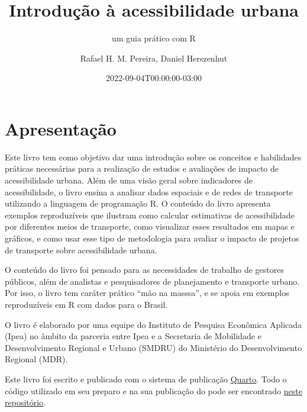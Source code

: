 \documentclass[
  letterpaper,
  DIV=11,
  numbers=noendperiod]{scrreprt}
\title{Introdução à acessibilidade urbana}
\subtitle{um guia prático com R}
\author{Rafael H. M. Pereira, Daniel Herszenhut}
\date{2022-09-04T00:00:00-03:00}
\renewcommand*\contentsname{Table of contents}
\newcommand\contentsname{Table of contents}
\begin{document}
\maketitle
\ifdefined\Shaded\renewenvironment{Shaded}{\begin{tcolorbox}[breakable, sharp corners, boxrule=0pt, enhanced, borderline west={3pt}{0pt}{shadecolor}, frame hidden, interior hidden]}{\end{tcolorbox}}\fi

\renewcommand*\contentsname{Table of contents}
{
\hypersetup{linkcolor=}
\setcounter{tocdepth}{2}
\tableofcontents
}
\hypertarget{apresentauxe7uxe3o}{%
\chapter*{Apresentação}\label{apresentauxe7uxe3o}}

Este livro tem como objetivo dar uma introdução sobre os conceitos e
habilidades práticas necessárias para a realização de estudos e
avaliações de impacto de acessibilidade urbana. Além de uma visão geral
sobre indicadores de acessibilidade, o livro ensina a analisar dados
espaciais e de redes de transporte utilizando a linguagem de programação
R. O conteúdo do livro apresenta exemplos reproduzíveis que ilustram
como calcular estimativas de acessibilidade por diferentes meios de
transporte, como visualizar esses resultados em mapas e gráficos, e como
usar esse tipo de metodologia para avaliar o impacto de projetos de
transporte sobre acessibilidade urbana.

O conteúdo do livro foi pensado para as necessidades de trabalho de
gestores públicos, além de analistas e pesquisadores de planejamento e
transporte urbano. Por isso, o livro tem caráter prático ``mão na
masssa'', e se apoia em exemplos reproduzíveis em R com dados para o
Brasil.

O livro é elaborado por uma equipe do Instituto de Pesquisa Econômica
Aplicada (Ipea) no âmbito da parceria entre Ipea e a Secretaria de
Mobilidade e Desenvolvimento Regional e Urbano (SMDRU) do Ministério do
Desenvolvimento Regional (MDR).

\begin{tcolorbox}[enhanced jigsaw, arc=.35mm, breakable, left=2mm, rightrule=.15mm, colback=white, leftrule=.75mm, bottomrule=.15mm, opacityback=0, toprule=.15mm, colframe=quarto-callout-note-color-frame]
\begin{minipage}[t]{5.5mm}
\textcolor{quarto-callout-note-color}{\faInfo}
\end{minipage}%
\begin{minipage}[t]{\textwidth - 5.5mm}
Este livro foi escrito e publicado com o sistema de publicação
\href{https://quarto.org}{Quarto}. Todo o código utilizado em seu
preparo e na sua publicação do pode ser encontrado
\href{https://github.com/ipeaGIT/aop_curso/tree/main/aop_curso_pt}{neste
repositório}.\end{minipage}%
\end{tcolorbox}
\end{document}
